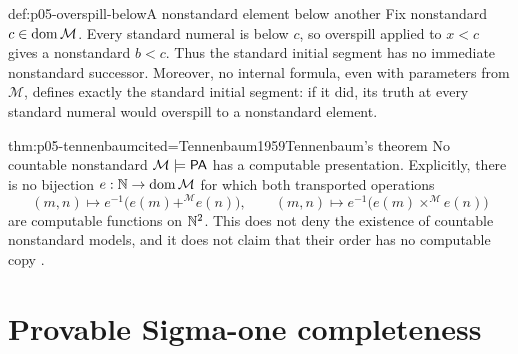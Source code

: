 \begin{hbexample}{def:p05-overspill-below}{A nonstandard element below another}
Fix nonstandard \(c\in\operatorname{dom}\mathcal M\).  Every standard numeral is below
\(c\), so overspill applied to \(x<c\) gives a nonstandard \(b<c\).
Thus the standard initial segment has no immediate nonstandard successor.
Moreover, no internal formula, even with parameters from \(\mathcal M\),
defines exactly the standard initial segment: if it did, its truth at every
standard numeral would overspill to a nonstandard element.
\end{hbexample}

\begin{hbtheorem}{thm:p05-tennenbaum}{cited=Tennenbaum1959}{Tennenbaum's theorem}
No countable nonstandard \(\mathcal M\models\mathsf{PA}\) has a computable
presentation.  Explicitly, there is no bijection
\(e:\mathbb{N}\to\operatorname{dom}\mathcal M\) for which both transported operations
\[
  (m,n)\longmapsto e^{-1}\!\bigl(e(m)+^{\mathcal M}e(n)\bigr),\qquad
  (m,n)\longmapsto e^{-1}\!\bigl(e(m)\times^{\mathcal M}e(n)\bigr)
\]
are computable functions on \(\mathbb{N}^2\).  This does not deny the existence
of countable nonstandard models, and it does not claim that their order
has no computable copy \cite{Kaye1991}.
\end{hbtheorem}

\section{Provable Sigma-one completeness}

